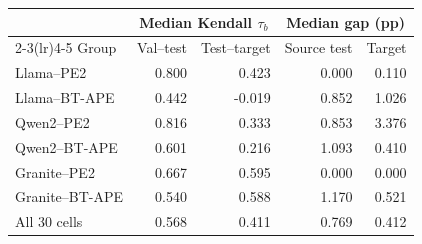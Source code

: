 \begin{tabular}{lrrrr}
\toprule
 & \multicolumn{2}{c}{Median Kendall $\tau_b$} & \multicolumn{2}{c}{Median gap (pp)} \\
\cmidrule(lr){2-3}\cmidrule(lr){4-5}
Group & Val--test & Test--target & Source test & Target \\
\midrule
Llama--PE2 & 0.800 & 0.423 & 0.000 & 0.110 \\
Llama--BT-APE & 0.442 & -0.019 & 0.852 & 1.026 \\
Qwen2--PE2 & 0.816 & 0.333 & 0.853 & 3.376 \\
Qwen2--BT-APE & 0.601 & 0.216 & 1.093 & 0.410 \\
Granite--PE2 & 0.667 & 0.595 & 0.000 & 0.000 \\
Granite--BT-APE & 0.540 & 0.588 & 1.170 & 0.521 \\
\midrule
All 30 cells & 0.568 & 0.411 & 0.769 & 0.412 \\
\bottomrule
\end{tabular}
